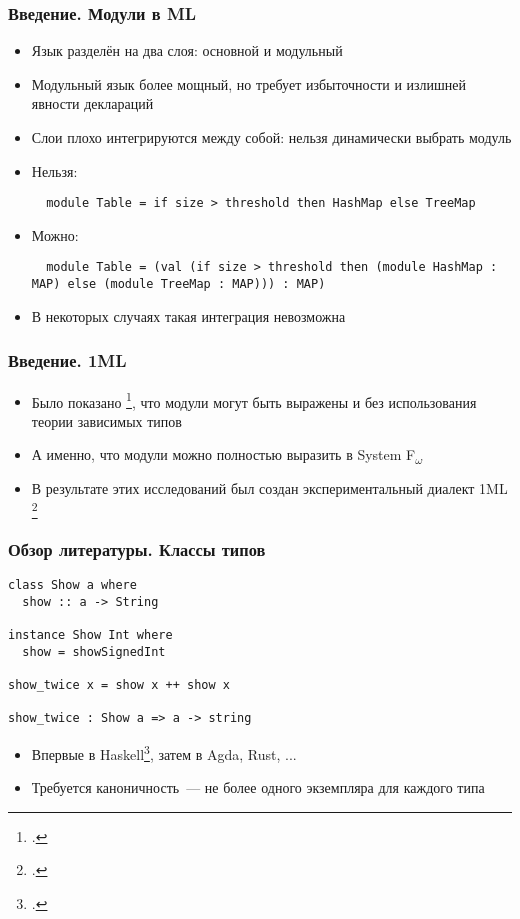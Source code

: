 \documentclass{beamer}
\begin{document}
\lstset{language=caml}
\begin{frame}[fragile]\frametitle{Введение. Модули в ML}
\begin{itemize}
  \item Язык разделён на два слоя: основной и модульный
  \item Модульный язык более мощный, но требует избыточности и излишней явности деклараций
  \item Слои плохо интегрируются между собой: нельзя динамически выбрать модуль
  \item Нельзя: \begin{lstlisting}
  module Table = if size > threshold then HashMap else TreeMap
  \end{lstlisting}
  \item Можно: \begin{lstlisting}
  module Table = (val (if size > threshold then (module HashMap : MAP) else (module TreeMap : MAP))) : MAP)
  \end{lstlisting}
  \item В некоторых случаях такая интеграция невозможна
\end{itemize}
\end{frame}

\begin{frame}\frametitle{Введение. 1ML}
\begin{itemize}
  \item Было показано \footcite{fing}, что модули могут быть выражены и без использования теории зависимых типов
  \item А именно, что модули можно полностью выразить в System F\textsubscript{$\omega$}
  \item В результате этих исследований был создан экспериментальный диалект 1ML \footcite{1ml}
\end{itemize}
\end{frame}

\lstset{language=haskell}
\begin{frame}[fragile]\frametitle{Обзор литературы. Классы типов}
\begin{lstlisting}
class Show a where
  show :: a -> String

instance Show Int where
  show = showSignedInt

show_twice x = show x ++ show x

show_twice : Show a => a -> string
\end{lstlisting}
\begin{itemize}
  \item Впервые в Haskell\footcite{adhoc}, затем в Agda, Rust, ...
  \item Требуется каноничность~--- не более одного экземпляра для каждого типа
\end{itemize}
\end{frame}
\end{document}
